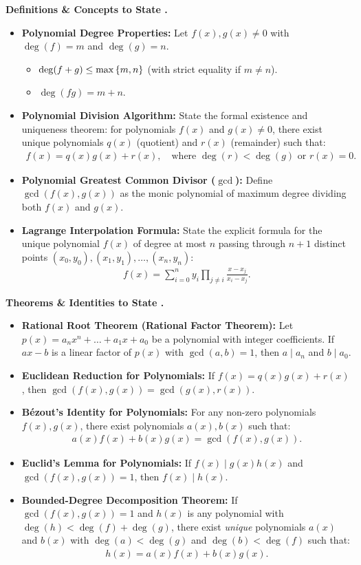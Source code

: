 \documentclass{natsirt}
\newcounter{topic}[section]
\newenvironment{recallbox}[1][]{%
    \begin{bluebox}[#1]\refstepcounter{topic}\textbf{Definitions \& Concepts to State \thesection.\thetopic}%
}{\end{bluebox}}
\newenvironment{theoremsbox}[1][]{%
    \begin{greenbox}[#1]\refstepcounter{topic}\textbf{Theorems \& Identities to State \thesection.\thetopic}%
}{\end{greenbox}}
\newcommand{\citem}{\item[$\square$]}
\begin{document}
\begin{recallbox}
    \begin{itemize}
        \citem \textbf{Polynomial Degree Properties:} Let $f(x), g(x) \neq 0$ with $\deg(f) = m$ and $\deg(g) = n$.
        \begin{itemize}
            \item $\deg(f + g) \le \max\left\{ m, n \right\}$ (with strict equality if $m \neq n$).
            \item $\deg(fg) = m + n$.
        \end{itemize}
        \citem \textbf{Polynomial Division Algorithm:} State the formal existence and uniqueness theorem: for polynomials $f(x)$ and $g(x) \neq 0$, there exist unique polynomials $q(x)$ (quotient) and $r(x)$ (remainder) such that:
        \begin{align*}
            f(x) = q(x)g(x) + r(x), \quad \text{where } \deg(r) < \deg(g) \text{ or } r(x) = 0.
        \end{align*}
        \citem \textbf{Polynomial Greatest Common Divisor ($\gcd$):} Define $\gcd(f(x), g(x))$ as the monic polynomial of maximum degree dividing both $f(x)$ and $g(x)$.
        \citem \textbf{Lagrange Interpolation Formula:} State the explicit formula for the unique polynomial $f(x)$ of degree at most $n$ passing through $n+1$ distinct points $(x_0, y_0), (x_1, y_1), \dots, (x_n, y_n)$:
        \begin{align*}
            f(x) = \sum_{i=0}^n y_i \prod_{j \neq i} \frac{x - x_j}{x_i - x_j}.
        \end{align*}
    \end{itemize}
\end{recallbox}

\begin{theoremsbox}
    \begin{itemize}
        \citem \textbf{Rational Root Theorem (Rational Factor Theorem):} Let $p(x) = a_n x^n + \dots + a_1 x + a_0$ be a polynomial with integer coefficients. If $ax - b$ is a linear factor of $p(x)$ with $\gcd(a, b) = 1$, then $a \mid a_n$ and $b \mid a_0$.
        \citem \textbf{Euclidean Reduction for Polynomials:} If $f(x) = q(x)g(x) + r(x)$, then $\gcd(f(x), g(x)) = \gcd(g(x), r(x))$.
        \citem \textbf{B\'ezout's Identity for Polynomials:} For any non-zero polynomials $f(x), g(x)$, there exist polynomials $a(x), b(x)$ such that:
        \begin{align*}
            a(x)f(x) + b(x)g(x) = \gcd(f(x), g(x)).
        \end{align*}
        \citem \textbf{Euclid's Lemma for Polynomials:} If $f(x) \mid g(x)h(x)$ and $\gcd(f(x), g(x)) = 1$, then $f(x) \mid h(x)$.
        \citem \textbf{Bounded-Degree Decomposition Theorem:} If $\gcd(f(x), g(x)) = 1$ and $h(x)$ is any polynomial with $\deg(h) < \deg(f) + \deg(g)$, there exist \emph{unique} polynomials $a(x)$ and $b(x)$ with $\deg(a) < \deg(g)$ and $\deg(b) < \deg(f)$ such that:
        \begin{align*}
            h(x) = a(x)f(x) + b(x)g(x).
        \end{align*}
    \end{itemize}
\end{theoremsbox}
\end{document}
